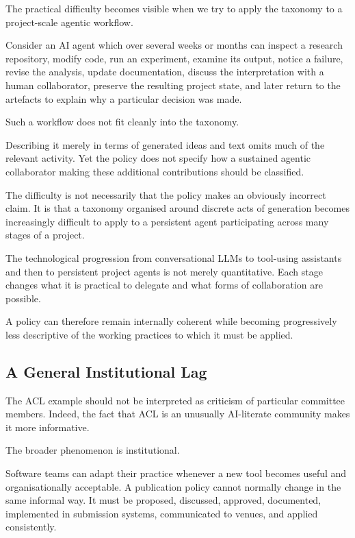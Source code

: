 The practical difficulty becomes visible when we try to apply the taxonomy to a project-scale agentic workflow.

Consider an AI agent which over several weeks or months can inspect a research repository, modify code, run an experiment, examine its output, notice a failure, revise the analysis, update documentation, discuss the interpretation with a human collaborator, preserve the resulting project state, and later return to the artefacts to explain why a particular decision was made.

Such a workflow does not fit cleanly into the taxonomy.

Describing it merely in terms of generated ideas and text omits much of the relevant activity. Yet the policy does not specify how a sustained agentic collaborator making these additional contributions should be classified.

The difficulty is not necessarily that the policy makes an obviously incorrect claim. It is that a taxonomy organised around discrete acts of generation becomes increasingly difficult to apply to a persistent agent participating across many stages of a project.

The technological progression from conversational LLMs to tool-using assistants and then to persistent project agents is not merely quantitative. Each stage changes what it is practical to delegate and what forms of collaboration are possible.

A policy can therefore remain internally coherent while becoming progressively less descriptive of the working practices to which it must be applied.


\subsection{A General Institutional Lag}

The ACL example should not be interpreted as criticism of particular committee members. Indeed, the fact that ACL is an unusually AI-literate community makes it more informative.

The broader phenomenon is institutional.

Software teams can adapt their practice whenever a new tool becomes useful and organisationally acceptable. A publication policy cannot normally change in the same informal way. It must be proposed, discussed, approved, documented, implemented in submission systems, communicated to venues, and applied consistently.

